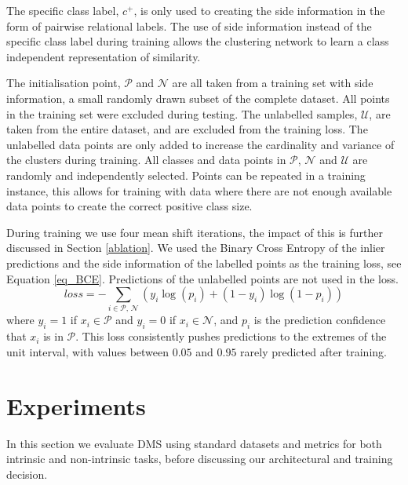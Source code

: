 \documentclass[letterpaper, 11pt]{IEEEtran}
\begin{document}
The specific class label, $c^+$, is only used to creating the side information in the form of pairwise relational labels. 
The use of side information instead of the specific class label during training allows the clustering network to learn a class independent representation of similarity.

The initialisation point, $\mathcal P$ and $\mathcal N$ are all taken from a training set with side information, a small randomly drawn subset of the complete dataset.  All points in the training set were excluded during testing.
The unlabelled samples, $\mathcal U$, are taken from the entire dataset, and are excluded from the training loss.
The unlabelled data points are only added to increase the cardinality and variance of the clusters during training.
All classes and data points in $\mathcal P$, $\mathcal N$ and $\mathcal U$ are randomly and independently selected. Points can be repeated in a training instance, 
this allows for training with data where there are not enough available data points
to create the correct positive class size.

During training we use four mean shift iterations, the impact of this is further discussed in Section \ref{ablation}.
We used the Binary Cross Entropy 
of the inlier predictions and the side information of the labelled points as the training loss, see Equation \ref{eq_BCE}. Predictions of the unlabelled points are not used in the loss. 
    \begin{equation}\label{eq_BCE}
    loss = -\sum_{i \in{\mathcal P,\, \mathcal N}} (y_i\log(p_i)+(1-y_i)\log(1-p_i)) 
    \end{equation}
where $y_i = 1$ if $x_i \in \mathcal P$ and $y_i = 0$ if $x_i \in \mathcal N$, and $p_i$ is the prediction confidence that $x_i$ is in $\mathcal{P}$. This loss consistently pushes predictions to the extremes of the unit interval,
with values between $0.05$ and $0.95$ rarely predicted after training.
\section{Experiments}\label{experiments}
In this section we evaluate DMS using standard datasets and metrics for both intrinsic and non-intrinsic tasks, before discussing our architectural and training decision. 

\end{document}
